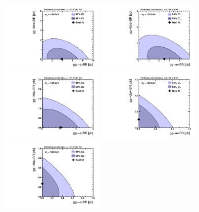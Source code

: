 \begin{figure}[!h]\begin{center}
 \includegraphics[width=0.45\textwidth]{MSSM/PLOTS/cmb-ggH-bbH-scan-GGH-BBH-120.pdf}
 \includegraphics[width=0.45\textwidth]{MSSM/PLOTS/cmb-ggH-bbH-scan-GGH-BBH-130.pdf}
 \includegraphics[width=0.45\textwidth]{MSSM/PLOTS/cmb-ggH-bbH-scan-GGH-BBH-140.pdf}
 \includegraphics[width=0.45\textwidth]{MSSM/PLOTS/cmb-ggH-bbH-scan-GGH-BBH-160.pdf}
 \includegraphics[width=0.45\textwidth]{MSSM/PLOTS/cmb-ggH-bbH-scan-GGH-BBH-180.pdf}

\end{center}
\end{figure}
